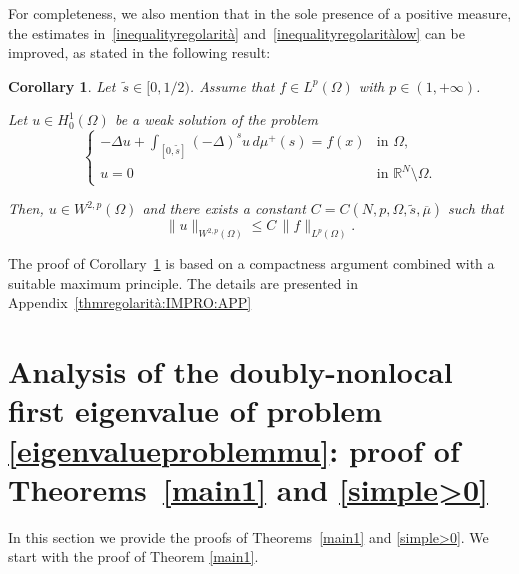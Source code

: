\documentclass[12pt,a4paper,intlimits,sumlimits]{amsart}
\def \R {\mathbb{R}}
\theoremstyle{definition}
\theoremstyle{plain}
\newtheorem{corollary}[definition]{Corollary}
\numberwithin{equation}{section}
\renewcommand{\leq}{\leqslant}
\begin{document}
For completeness, we also mention that in the sole presence of a positive measure,
the estimates in~\eqref{inequalityregolarità} and~\eqref{inequalityregolaritàlow}
can be improved, as stated in the following result:

\begin{corollary}\label{thmregolarità:IMPRO}
Let~$\widetilde s\in[0,1/2)$.
Assume that $f\in L^p(\Omega)$ with $p\in(1,+\infty)$. 

Let $u\in H^1_0(\Omega)$ be a weak solution of the problem
\begin{equation*}
\begin{cases}
-\Delta u +\displaystyle\int_{[0,\widetilde s]}(-\Delta)^s u\,d\mu^+(s)
=f(x) & \mbox{in } \Omega,
\\
u=0  & \mbox{in } \R^N\setminus \Omega.
\end{cases}
\end{equation*}

Then, $u\in W^{2,p}(\Omega)$ and there exists a constant $C=C(N,p,\Omega,\widetilde s,\overline\mu)$ such that$$
\|u\|_{W^{2,p}(\Omega)}\leq 
C\, \|f\|_{L^p(\Omega)}.$$
\end{corollary}

The proof of Corollary~\ref{thmregolarità:IMPRO} is based on a compactness argument combined with
a suitable maximum principle. The details are presented in Appendix~\ref{thmregolarità:IMPRO:APP}

\section{Analysis of the doubly-nonlocal
first eigenvalue of problem \eqref{eigenvalueproblemmu}:
proof of Theorems~\ref{main1} and \ref{simple>0}}\label{0qspidkfewp0rthn9nf5ac01sklO}
In this section we provide the proofs of Theorems~\ref{main1} and \ref{simple>0}.
We start with the proof of Theorem \ref{main1}.
\end{document}
